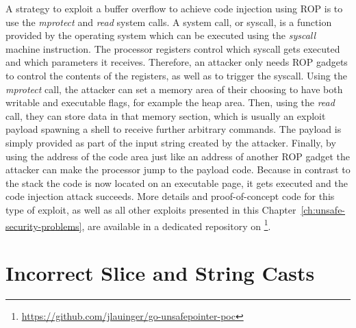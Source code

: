A strategy to exploit a buffer overflow to achieve code injection using \acrshort{ROP} is to use the \textit{mprotect}
and \textit{read} system calls.
A system call, or syscall, is a function provided by the operating system which can be executed using the
\textit{syscall} machine instruction.
The processor registers control which syscall gets executed and which parameters it receives.
Therefore, an attacker only needs \acrshort{ROP} gadgets to control the contents of the registers, as well as to trigger
the syscall.
Using the \textit{mprotect} call, the attacker can set a memory area of their choosing to have both writable and
executable flags, for example the heap area.
Then, using the \textit{read} call, they can store data in that memory section, which is usually an exploit payload
spawning a shell to receive further arbitrary commands.
The payload is simply provided as part of the input string created by the attacker.
Finally, by using the address of the code area just like an address of another \acrshort{ROP} gadget the attacker can
make the processor jump to the payload code.
Because in contrast to the stack the code is now located on an executable page, it gets executed and the code injection
attack succeeds.
More details and proof-of-concept code for this type of exploit, as well as all other exploits presented in this
Chapter~\ref{ch:unsafe-security-problems}, are available in a dedicated repository on
\github{}\footnote{\url{https://github.com/jlauinger/go-unsafepointer-poc}}.



\section{Incorrect Slice and String Casts}\label{sec:unsafe-security-problems:slice-casts}

